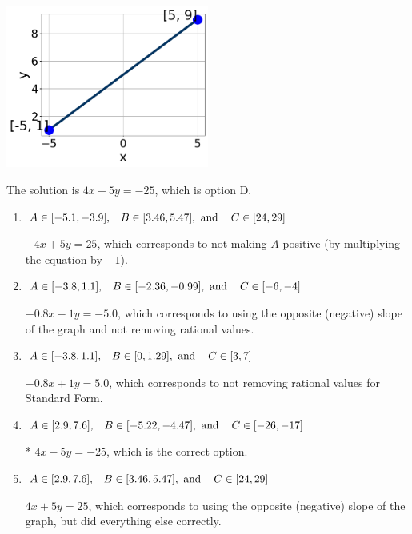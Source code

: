 \documentclass{extbook}[14pt]
\begin{document}
\begin{enumerate}
{\begin{center}
    \includegraphics[width=0.5\textwidth]{../Figures/linearGraphToStandardCopyC.png}
\end{center}


The solution is \( 4x - 5y = -25 \), which is option D.\begin{enumerate}[label=\Alph*.]
\item \( A \in [-5.1, -3.9], \hspace{3mm} B \in [3.46, 5.47], \text{ and } \hspace{3mm} C \in [24, 29] \)

 $-4x + 5y = 25$, which corresponds to not making $A$ positive (by multiplying the equation by $-1$).
\item \( A \in [-3.8, 1.1], \hspace{3mm} B \in [-2.36, -0.99], \text{ and } \hspace{3mm} C \in [-6, -4] \)

 $-0.8x - 1y = -5.0$, which corresponds to using the opposite (negative) slope of the graph and not removing rational values.
\item \( A \in [-3.8, 1.1], \hspace{3mm} B \in [0, 1.29], \text{ and } \hspace{3mm} C \in [3, 7] \)

 $-0.8x + 1y = 5.0$, which corresponds to not removing rational values for Standard Form.
\item \( A \in [2.9, 7.6], \hspace{3mm} B \in [-5.22, -4.47], \text{ and } \hspace{3mm} C \in [-26, -17] \)

* $4x - 5y = -25$, which is the correct option.
\item \( A \in [2.9, 7.6], \hspace{3mm} B \in [3.46, 5.47], \text{ and } \hspace{3mm} C \in [24, 29] \)

 $4x + 5y = 25$, which corresponds to using the opposite (negative) slope of the graph, but did everything else correctly.
\end{enumerate}

}
\end{enumerate}
\end{document}
